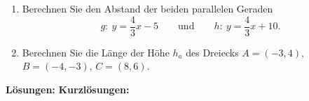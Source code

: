 \begin{ueb}
\begin{enumerate}
\begin{enumerate}
                  \item Berechnen Sie den Abstand der beiden parallelen Geraden
                        \[
                            g:\ y=\frac43x-5
                            \qquad\text{und}\qquad
                            h:\ y=\frac43x+10.
                        \]

                  \item Berechnen Sie die Länge der Höhe \(h_a\) des Dreiecks
                        \(A=(-3, 4)\), \(B=(-4, -3)\), \(C=(8, 6)\).
              \end{enumerate}
    \end{enumerate}

\end{ueb}

\clearpage
\textbf{Lösungen:}
\textbf{Kurzlösungen:}

